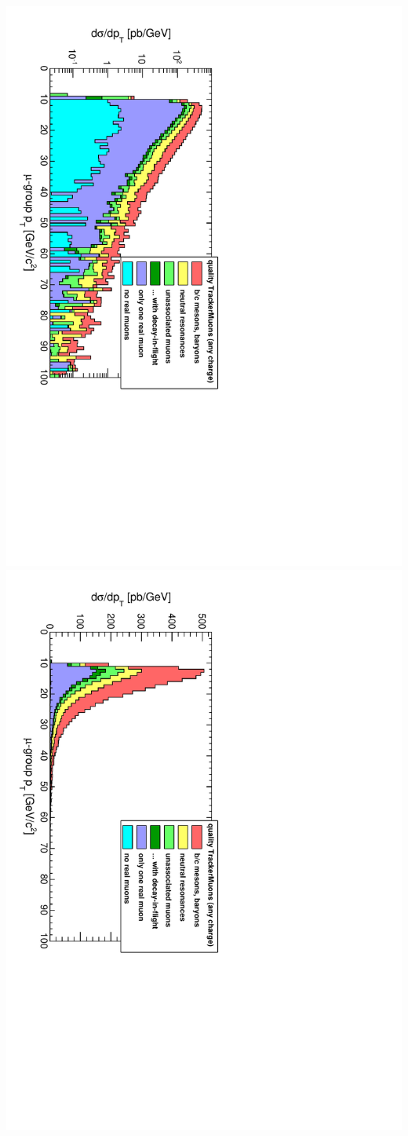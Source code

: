\documentclass[compress]{beamer}
\begin{document}
\begin{frame}
{\includegraphics[height=0.5\linewidth, angle=90]{ptlog_QualityTrackerMuonAny.pdf}
\includegraphics[height=0.5\linewidth, angle=90]{ptlinear_QualityTrackerMuonAny.pdf}}

\end{frame}
\end{document}
